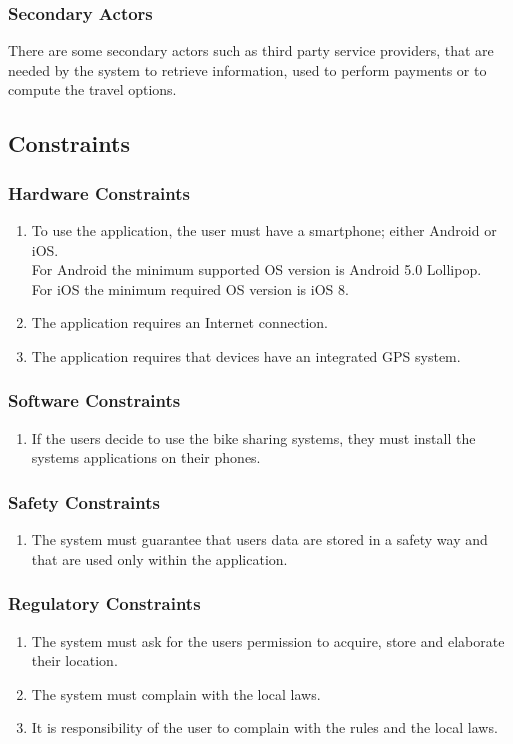 \subsubsection{Secondary Actors}
There are some secondary actors such as third party service providers, that are needed by the system to retrieve information, used to perform payments or to compute the travel options. 


\subsection{Constraints}
\subsubsection{Hardware Constraints}
\begin{enumerate}
\item
To use the application, the user must have a smartphone; either Android or iOS.\\
For Android the minimum supported OS version is Android 5.0 Lollipop.\\
For iOS the minimum required OS version is iOS 8.
\item
The application requires an Internet connection.
\item
The application requires that devices have an integrated GPS system.
\end{enumerate}

\subsubsection{Software Constraints}
\begin{enumerate}
\item
If the users decide to use the bike sharing systems, they must install the systems applications on their phones.
\end{enumerate}

\subsubsection{Safety Constraints}
\begin{enumerate}
\item
The system must guarantee that users data are stored in a safety way and that are used only within the application.
\end{enumerate}

\subsubsection{Regulatory Constraints}
\begin{enumerate}
\item
The system must ask for the users permission to acquire, store and elaborate their location.
\item
The system must complain with the local laws.
\item
It is responsibility of the user to complain with the rules and the local laws.
\end{enumerate}

